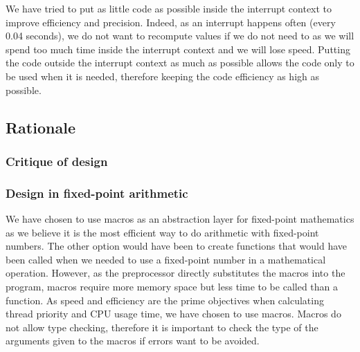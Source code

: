 \documentclass{article}
\renewcommand{\_}{\char`_}
\begin{document}
We have tried to put as little code as possible inside the interrupt context to improve efficiency and precision. Indeed, as an interrupt happens often (every 0.04 seconds), we do not want to recompute values if we do not need to as we will spend too much time inside the interrupt context and we will lose speed. Putting the code outside the interrupt context as much as possible allows the code only to be used when it is needed, therefore keeping the code efficiency as high as possible. 


\subsection{Rationale}
\subsubsection{Critique of design}

\subsubsection{Design in fixed-point arithmetic}

We have chosen to use macros as an abstraction layer for fixed-point mathematics as we believe it is the most efficient way to do arithmetic with fixed-point numbers. The other option would have been to create functions that would have been called when we needed to use a fixed-point number in a mathematical operation. However, as the preprocessor directly substitutes the macros into the program, macros require more memory space but less time to be called than a function. As speed and efficiency are the prime objectives when calculating thread priority and CPU usage time, we have chosen to use macros.
Macros do not allow type checking, therefore it is important to check the type of the arguments given to the macros if errors want to be avoided.

\end{document}
